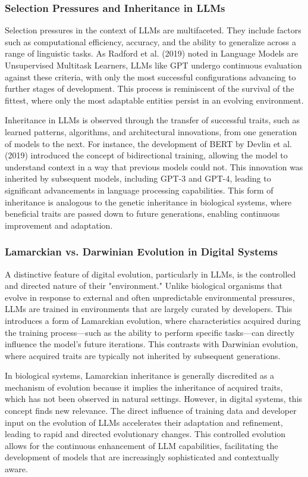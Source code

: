 \documentclass[12pt,twoside]{article}
\begin{document}
\subsubsection{Selection Pressures and Inheritance in LLMs}

Selection pressures in the context of LLMs are multifaceted. They include factors such as computational efficiency, accuracy, and the ability to generalize across a range of linguistic tasks. As Radford et al. (2019) noted in Language Models are Unsupervised Multitask Learners, LLMs like GPT undergo continuous evaluation against these criteria, with only the most successful configurations advancing to further stages of development. This process is reminiscent of the survival of the fittest, where only the most adaptable entities persist in an evolving environment.

Inheritance in LLMs is observed through the transfer of successful traits, such as learned patterns, algorithms, and architectural innovations, from one generation of models to the next. For instance, the development of BERT by Devlin et al. (2019) introduced the concept of bidirectional training, allowing the model to understand context in a way that previous models could not. This innovation was inherited by subsequent models, including GPT-3 and GPT-4, leading to significant advancements in language processing capabilities. This form of inheritance is analogous to the genetic inheritance in biological systems, where beneficial traits are passed down to future generations, enabling continuous improvement and adaptation.

\subsubsection{Lamarckian vs. Darwinian Evolution in Digital Systems}

A distinctive feature of digital evolution, particularly in LLMs, is the controlled and directed nature of their "environment." Unlike biological organisms that evolve in response to external and often unpredictable environmental pressures, LLMs are trained in environments that are largely curated by developers. This introduces a form of Lamarckian evolution, where characteristics acquired during the training process—such as the ability to perform specific tasks—can directly influence the model's future iterations. This contrasts with Darwinian evolution, where acquired traits are typically not inherited by subsequent generations.

In biological systems, Lamarckian inheritance is generally discredited as a mechanism of evolution because it implies the inheritance of acquired traits, which has not been observed in natural settings. However, in digital systems, this concept finds new relevance. The direct influence of training data and developer input on the evolution of LLMs accelerates their adaptation and refinement, leading to rapid and directed evolutionary changes. This controlled evolution allows for the continuous enhancement of LLM capabilities, facilitating the development of models that are increasingly sophisticated and contextually aware.
\end{document}
